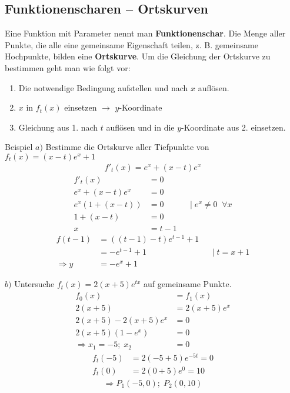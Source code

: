\documentclass{article}
\begin{document}
\subsection{Funktionenscharen -- Ortskurven}
Eine Funktion mit Parameter nennt man \textbf{Funktionenschar}.
Die Menge aller Punkte, die alle eine gemeinsame Eigenschaft teilen, z. B.
gemeinsame Hochpunkte, bilden eine \textbf{Ortskurve}.
Um die Gleichung der Ortskurve zu bestimmen geht man wie folgt vor:
\begin{enumerate}
    \item Die notwendige Bedingung aufstellen und nach $x$ auflösen.
    \item $x$ in $f_t(x)$ einsetzen $\rightarrow$ $y$-Koordinate
    \item Gleichung aus 1. nach $t$ auflösen und in die $y$-Koordinate aus 2. einsetzen.
\end{enumerate}
\begin{boxx}[DarkBlue]{Beispiel}
    $a)$\hspace{3mm} Bestimme die Ortskurve aller Tiefpunkte von $\displaystyle f_t(x) = (x-t)e^x + 1$
    \begin{align*}
        f'_t(x) = e^x + (x-t)e^x
    \end{align*}
    \begin{align*}
        f'_t(x) &= 0 \\
        e^x + (x-t)e^x &= 0 \\
        e^x\left(1 + (x-t)\right) &= 0 & &|\; e^x \not = 0 \;\;\forall x\\
        1 + (x-t) &= 0 \\
        x &= t-1
    \end{align*}
    \begin{align*}
        f(t-1) &= \left((t-1)-t\right)e^{t-1} + 1 \\
        &= -e^{t-1} + 1 & &|\; t = x+1 \\
        \Rightarrow y &= -e^x + 1
    \end{align*}

    $b)$\hspace{3mm} Untersuche $\displaystyle f_t(x) = 2(x+5)e^{tx}$ auf gemeinsame Punkte.
    \begin{align*}
        f_0(x) &= f_1(x) \\
        2(x+5) &= 2(x+5)e^{x} \\
        2(x+5) - 2(x+5)e^{x} &= 0 \\
        2(x+5)(1 - e^x) &= 0 \\
        \Rightarrow x_1 = -5;\; x_2 &= 0
    \end{align*}
    \begin{align*}
        f_t(-5) &= 2(-5+5)e^{-5t} = 0 \\
        f_t(0) &= 2(0+5)e^{0} = 10
    \end{align*}
    \begin{align*}
        \Rightarrow P_1(-5,0);\; P_2(0,10)
    \end{align*}
\end{boxx}
\newpage
\end{document}
